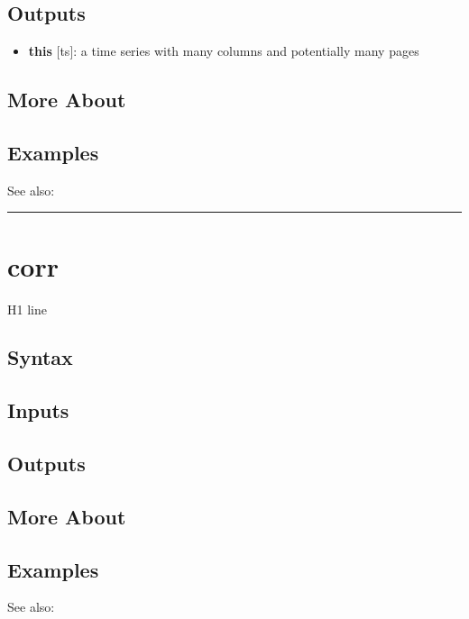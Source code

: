 \documentclass[letterpaper,10pt,english]{sphinxmanual}
\begin{document}
\subsection{Outputs}
\label{classes/time_series/@ts/ts:id110}\begin{itemize}
\item {} 
\textbf{this} {[}ts{]}: a time series with many columns and potentially many
pages

\end{itemize}


\subsection{More About}
\label{classes/time_series/@ts/ts:id111}

\subsection{Examples}
\label{classes/time_series/@ts/ts:id112}
See also:


\bigskip\hrule{}\bigskip



\section{corr}
\label{classes/time_series/@ts/ts:id113}\label{classes/time_series/@ts/ts:corr}
H1 line


\subsection{Syntax}
\label{classes/time_series/@ts/ts:id114}

\subsection{Inputs}
\label{classes/time_series/@ts/ts:id115}

\subsection{Outputs}
\label{classes/time_series/@ts/ts:id116}

\subsection{More About}
\label{classes/time_series/@ts/ts:id117}

\subsection{Examples}
\label{classes/time_series/@ts/ts:id118}
See also:
\end{document}
